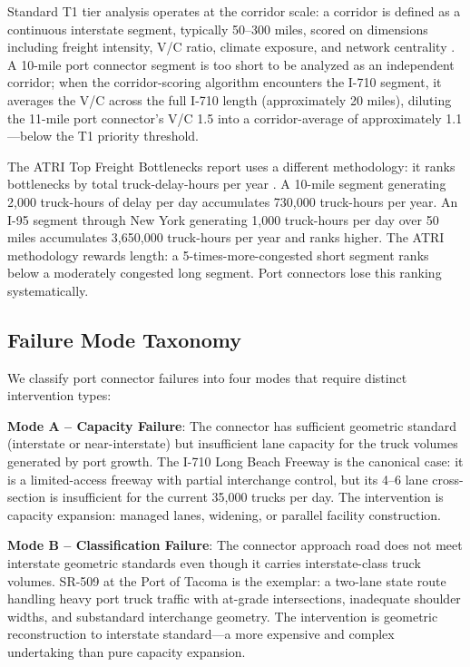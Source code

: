 Standard T1 tier analysis operates at the corridor scale: a corridor is defined as a continuous interstate segment, typically 50--300 miles, scored on dimensions including freight intensity, V/C ratio, climate exposure, and network centrality \citep{ROUTE_A1}. A 10-mile port connector segment is too short to be analyzed as an independent corridor; when the corridor-scoring algorithm encounters the I-710 segment, it averages the V/C across the full I-710 length (approximately 20 miles), diluting the 11-mile port connector's V/C 1.5 into a corridor-average of approximately 1.1---below the T1 priority threshold.

The ATRI Top Freight Bottlenecks report uses a different methodology: it ranks bottlenecks by total truck-delay-hours per year \citep{ATRI_costs2024}. A 10-mile segment generating 2,000 truck-hours of delay per day accumulates 730,000 truck-hours per year. An I-95 segment through New York generating 1,000 truck-hours per day over 50 miles accumulates 3,650,000 truck-hours per year and ranks higher. The ATRI methodology rewards length: a 5-times-more-congested short segment ranks below a moderately congested long segment. Port connectors lose this ranking systematically.

\subsection{Failure Mode Taxonomy}

We classify port connector failures into four modes that require distinct intervention types:

\textbf{Mode A -- Capacity Failure}: The connector has sufficient geometric standard (interstate or near-interstate) but insufficient lane capacity for the truck volumes generated by port growth. The I-710 Long Beach Freeway is the canonical case: it is a limited-access freeway with partial interchange control, but its 4--6 lane cross-section is insufficient for the current 35,000 trucks per day. The intervention is capacity expansion: managed lanes, widening, or parallel facility construction.

\textbf{Mode B -- Classification Failure}: The connector approach road does not meet interstate geometric standards even though it carries interstate-class truck volumes. SR-509 at the Port of Tacoma is the exemplar: a two-lane state route handling heavy port truck traffic with at-grade intersections, inadequate shoulder widths, and substandard interchange geometry. The intervention is geometric reconstruction to interstate standard---a more expensive and complex undertaking than pure capacity expansion.

